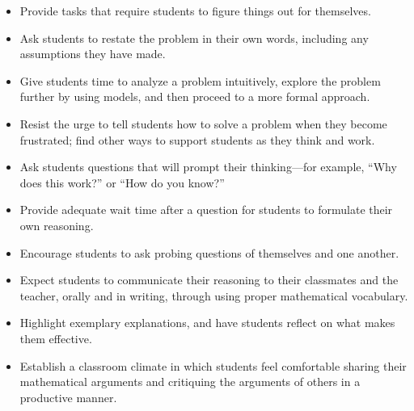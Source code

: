 \documentclass[
  10pt,
  a4paper,
  landscape,
  twoside,
  openany
]{scrbook}
\newcommand{\EN}[1]{#1}
\newcounter{example}
\begin{document}
\TriPara
{
\EN{
  \begin{itemize}
    \item Provide tasks that require students to figure things out for themselves.
    \item Ask students to restate the problem in their own words, including any assumptions they have made.
    \item Give students time to analyze a problem intuitively, explore the problem further by using models, and then proceed to a more formal approach.
    \item Resist the urge to tell students how to solve a problem when they become frustrated; find other ways to support students as they think and work.
    \item Ask students questions that will prompt their thinking---for example, ``Why does this work?'' or ``How do you know?''
    \item Provide adequate wait time after a question for students to formulate their own reasoning.
    \item Encourage students to ask probing questions of themselves and one another.
    \item Expect students to communicate their reasoning to their classmates and the teacher, orally and in writing, through using proper mathematical vocabulary.
    \item Highlight exemplary explanations, and have students reflect on what makes them effective.
    \item Establish a classroom climate in which students feel comfortable sharing their mathematical arguments and critiquing the arguments of others in a productive manner.
  \end{itemize}
}
}
\end{document}
